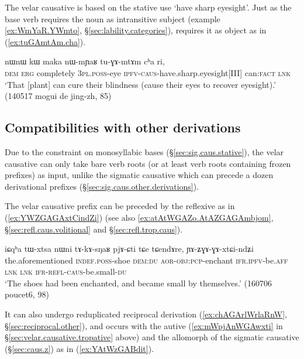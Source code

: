 The velar causative   is based on the stative use `have sharp eyesight'. Just as the base verb requires the noun  as intransitive subject (example \ref{ex:WmYaR.YWmto}, §\ref{sec:lability.categories}),  requires it as object as in (\ref{ex:tuGAmtAm.cha}).

\begin{exe}
\ex \label{ex:tuGAmtAm.cha}
\gll  nɯnɯ kɯ maka nɯ-mɲaʁ tu-ɣɤ-mtɤm cʰa ri, \\
\textsc{dem} \textsc{erg} completely \textsc{3pl}.\textsc{poss}-eye \textsc{ipfv}-\textsc{caus}-have.sharp.eyesight[III] can:\textsc{fact} \textsc{lnk} \\
\glt `That [plant] can cure their blindness (cause their eyes to recover eyesight).' (140517 mogui de jing-zh, 85)
\end{exe} 

\subsection{Compatibilities with other derivations} \label{sec:velar.caus.other}
Due to the constraint on monosyllabic bases (§\ref{sec:sig.caus.stative}), the velar causative can only take bare verb roots (or at least verb roots containing frozen prefixes) as input, unlike the sigmatic causative which can precede a dozen derivational prefixes (§\ref{sec:sig.caus.other.derivations}).

The velar causative prefix can be preceded by the reflexive  as in (\ref{ex:YWZGAGAxtCindZi}) (see also \ref{ex:atAtWGAZo.AtAZGAGAmbjom}, §\ref{sec:refl.caus.volitional} and §\ref{sec:refl.trop.caus}).

\begin{exe}
\ex \label{ex:YWZGAGAxtCindZi}
\gll  iɕqʰa tɯ-xtsa nɯni tɤ-kɤ-sŋaʁ pjɤ-ɕti tɕe tɕendɤre, ɲɤ-ʑɣɤ-ɣɤ-xtɕi-ndʑi \\
the.aforementioned \textsc{indef}.\textsc{poss}-shoe \textsc{dem}:\textsc{du} \textsc{aor}-\textsc{obj}:\textsc{pcp}-enchant \textsc{ifr}.\textsc{ipfv}-be.\textsc{aff} \textsc{lnk} \textsc{lnk} \textsc{ifr}-\textsc{refl}-\textsc{caus}-be.small-\textsc{du} \\
\glt `The shoes had been enchanted, and became small by themselves.' (160706 poucet6, 98)
\end{exe} 

It can also undergo reduplicated reciprocal derivation (\ref{ex:chAGArlWrlaRnW}, §\ref{sec:reciprocal.other}),  and occurs with the autive  (\ref{ex:mWpjAnWGAwxti} in §\ref{sec:velar.causative.tropative} above) and the  allomorph of the sigmatic causative (§\ref{sec:caus.z}) as in (\ref{ex:YAtWzGABdit}).
 
